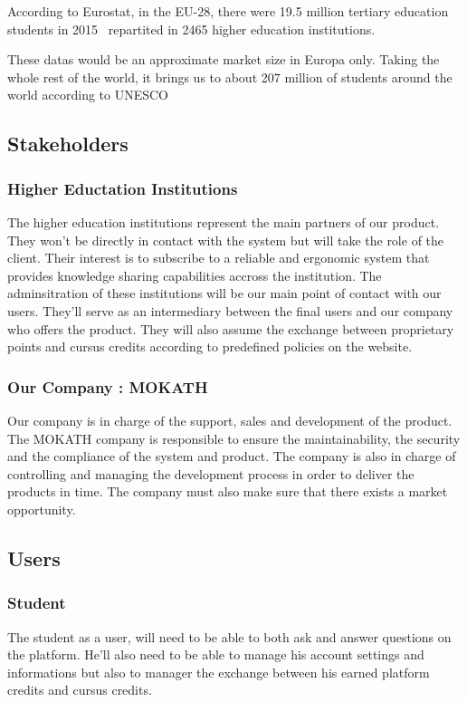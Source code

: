 \documentclass[12pt,a4paper,oneside, titlepage]{article}
\begin{document}
	According to Eurostat, in the EU-28, there were 19.5 million tertiary education students in 
	2015~\cite{tertiaryStudentsEU} repartited in 2465 higher education institutions. \newline
	
	These datas would be an approximate market size in Europa only. Taking the whole rest of the world, it brings us to about 207 million of students 
	around the world according to UNESCO~\cite{higherEducationPaper}
	
	\subsection{Stakeholders}
	    \subsubsection{Higher Eductation Institutions}
	        The higher education institutions represent the main partners of our product. They won't be directly in
	        contact with the system but will take the role of the client. Their interest is to subscribe to a reliable
	        and ergonomic system that provides knowledge sharing capabilities accross the institution. The 
	        adminsitration of these institutions will be our main point of contact with our users. They'll serve as an
	        intermediary between the final users and our company who offers the product. They will also assume the
	        exchange between proprietary points and cursus credits according to predefined policies on the website. 
	    
	    \subsubsection{Our Company : MOKATH}
	        Our company is in charge of the support, sales and development of the product. The MOKATH company is 
	        responsible to ensure the maintainability, the security and the compliance of the system and product.
	        The company is also in charge of controlling and managing the development process in order to deliver the
	        products in time. The company must also make sure that there exists a market opportunity.
	        
	\subsection{Users}
	    \subsubsection{Student}
	    The student as a user, will need to be able to both ask and answer questions on the platform. He'll also need to 
	    be able to manage his account settings and informations but also to manager the exchange between his earned
	    platform credits and cursus credits.
	    
\end{document}
